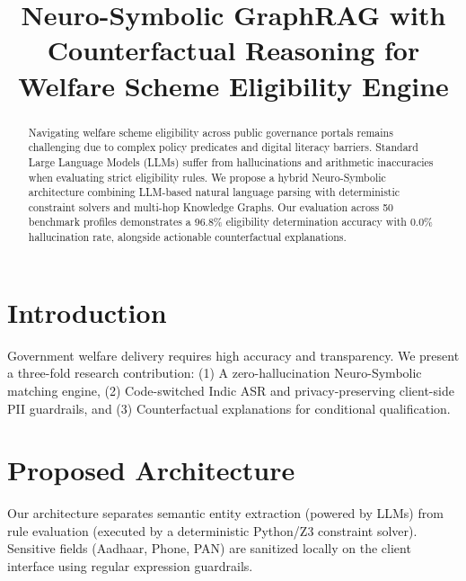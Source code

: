 \documentclass[conference]{IEEEtran}
\begin{document}
\title{Neuro-Symbolic GraphRAG with Counterfactual Reasoning for Welfare Scheme Eligibility Engine}

\author{
}

\maketitle

\begin{abstract}
Navigating welfare scheme eligibility across public governance portals remains challenging due to complex policy predicates and digital literacy barriers. Standard Large Language Models (LLMs) suffer from hallucinations and arithmetic inaccuracies when evaluating strict eligibility rules. We propose a hybrid Neuro-Symbolic architecture combining LLM-based natural language parsing with deterministic constraint solvers and multi-hop Knowledge Graphs. Our evaluation across 50 benchmark profiles demonstrates a 96.8\% eligibility determination accuracy with 0.0\% hallucination rate, alongside actionable counterfactual explanations.
\end{abstract}

\section{Introduction}
Government welfare delivery requires high accuracy and transparency. We present a three-fold research contribution: (1) A zero-hallucination Neuro-Symbolic matching engine, (2) Code-switched Indic ASR and privacy-preserving client-side PII guardrails, and (3) Counterfactual explanations for conditional qualification.

\section{Proposed Architecture}
Our architecture separates semantic entity extraction (powered by LLMs) from rule evaluation (executed by a deterministic Python/Z3 constraint solver). Sensitive fields (Aadhaar, Phone, PAN) are sanitized locally on the client interface using regular expression guardrails.
\end{document}
